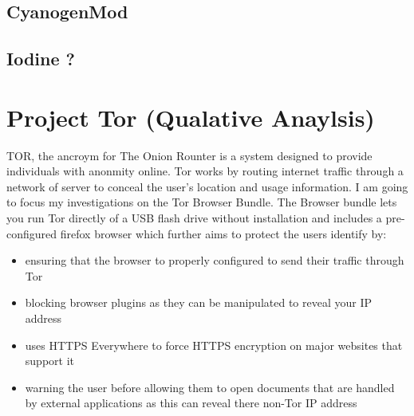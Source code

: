 \documentclass[12pt,a4paper,oneside]{article}
\begin{document}
\subsection{CyanogenMod}

\subsection{Iodine ?}


\section{Project Tor (Qualative Anaylsis)}

TOR, the ancroym for The Onion Rounter is a system designed to provide individuals with anonmity online. Tor works by routing internet traffic through a network of server to conceal the user's location and usage information. 
I am going to focus my investigations on the Tor Browser Bundle. The Browser bundle lets you run Tor directly of a USB flash drive without installation and includes a pre-configured firefox browser which further aims to protect the users identify by:
\begin{itemize}
\item ensuring that the browser to properly configured to send their traffic through Tor
\item blocking browser plugins as they can be manipulated to reveal your IP address 
\item uses HTTPS Everywhere to force HTTPS encryption on major websites that support it
\item warning the user before allowing them to open documents that are handled by external applications as this can reveal there non-Tor IP address

\end{itemize}
\end{document}
